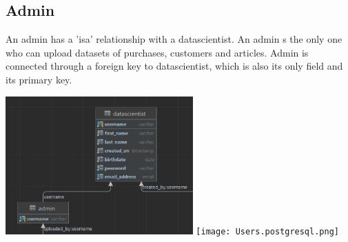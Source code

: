 \documentclass[a4paper,12pt]{article}
\begin{document}
	\subsection{Admin}
	An admin has a 'isa' relationship with a datascientist. An admin s the only one who can upload datasets of purchases, customers and articles. Admin is connected through a foreign key to datascientist, which is also its only field and its primary key.
		\begin{center}
		  		\includegraphics[height={200px},width=\textwidth,keepaspectratio]{Users.png}
		  		\texttt{[image: Users.postgresql.png]}
	\end{center}
	\pagebreak
\end{document}
